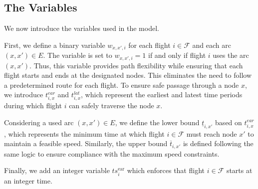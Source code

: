 \documentclass[../../thesis.tex]{subfiles}
\begin{document}
\subsection{The Variables} \label{sec:modelVar}  

We now introduce the variables used in the model.  

First, we define a binary variable \( w_{x,x',i} \) for each flight \( i\in\mathcal F \) and each arc \( (x,x')\in E \).  
The variable is set to \( w_{x,x',i} = 1 \) if and only if flight \( i \) uses the arc \( (x,x') \).  
Thus, this variable provides path flexibility while ensuring that each flight starts and ends at the designated nodes. This eliminates the need to follow a predetermined route for each flight.
To ensure safe passage through a node \( x \), we introduce \( t^{ear}_{i,x} \) and \( t^{lat}_{i,x} \), which represent the earliest and latest time periods during which flight \( i \) can safely traverse the node \( x \).  

Considering a used arc \( (x,x')\in E \), we define the lower bound \( \underline{t}_{i,x'} \) based on \( t^{ear}_{i,x} \), which represents the minimum time at which flight \( i\in\mathcal F \) must reach node \( x' \) to maintain a feasible speed.  
Similarly, the upper bound \( \overline{t}_{i,x'} \) is defined following the same logic to ensure compliance with the maximum speed constraints.  

Finally, we add an integer variable \( ts^\text{ear}_i \) which enforces that flight \( i\in\mathcal F \) starts at an integer time.
\end{document}
